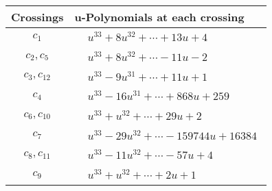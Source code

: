 \documentclass[1p]{elsarticle_modified}
\theoremstyle{definition}
\begin{document}
\begin{tabular}{m{50pt}|m{274pt}}
Crossings & \hspace{64pt}u-Polynomials at each crossing \\
\hline $$\begin{aligned}c_{1}\end{aligned}$$&$\begin{aligned}
&u^{33}+8 u^{32}+\cdots+13 u+4
\end{aligned}$\\
\hline $$\begin{aligned}c_{2},c_{5}\end{aligned}$$&$\begin{aligned}
&u^{33}+8 u^{32}+\cdots-11 u-2
\end{aligned}$\\
\hline $$\begin{aligned}c_{3},c_{12}\end{aligned}$$&$\begin{aligned}
&u^{33}-9 u^{31}+\cdots+11 u+1
\end{aligned}$\\
\hline $$\begin{aligned}c_{4}\end{aligned}$$&$\begin{aligned}
&u^{33}-16 u^{31}+\cdots+868 u+259
\end{aligned}$\\
\hline $$\begin{aligned}c_{6},c_{10}\end{aligned}$$&$\begin{aligned}
&u^{33}+u^{32}+\cdots+29 u+2
\end{aligned}$\\
\hline $$\begin{aligned}c_{7}\end{aligned}$$&$\begin{aligned}
&u^{33}-29 u^{32}+\cdots-159744 u+16384
\end{aligned}$\\
\hline $$\begin{aligned}c_{8},c_{11}\end{aligned}$$&$\begin{aligned}
&u^{33}-11 u^{32}+\cdots-57 u+4
\end{aligned}$\\
\hline $$\begin{aligned}c_{9}\end{aligned}$$&$\begin{aligned}
&u^{33}+u^{32}+\cdots+2 u+1
\end{aligned}$\\
\hline
\end{tabular}\\~\\
\end{document}
